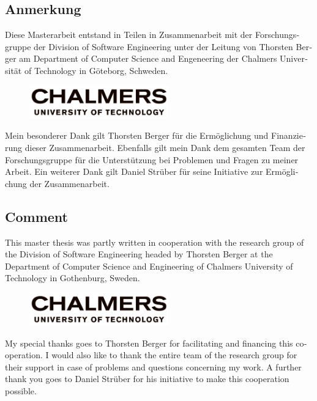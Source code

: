 
\begin{otherlanguage}{ngerman}
    \section*{Anmerkung}

Diese Masterarbeit entstand in Teilen in Zusammenarbeit mit der Forschungsgruppe der Division of Software Engineering unter der Leitung von Thorsten Berger am Department of Computer Science and Engeneering der Chalmers Universität of Technology in Göteborg, Schweden.

\begin{figure}[H]
    \centering
    \includegraphics[width=6cm]{logos/chalmers}
\end{figure}

Mein besonderer Dank gilt Thorsten Berger für die Ermöglichung und Finanzierung dieser Zusammenarbeit. Ebenfalls gilt mein Dank dem gesamten Team der Forschungsgruppe für die Unterstützung bei Problemen und Fragen zu meiner Arbeit. Ein weiterer Dank gilt Daniel Strüber für seine Initiative zur Ermöglichung der Zusammenarbeit.

\end{otherlanguage}

\begin{otherlanguage}{english}
    \section*{Comment}

This master thesis was partly written in cooperation with the research group of the Division of Software Engineering headed by Thorsten Berger at the Department of Computer Science and Engineering of Chalmers University of Technology in Gothenburg, Sweden.

\begin{figure}[H]
    \centering
    \includegraphics[width=6cm]{logos/chalmers}
\end{figure}

My special thanks goes to Thorsten Berger for facilitating and financing this cooperation. I would also like to thank the entire team of the research group for their support in case of problems and questions concerning my work. A further thank you goes to Daniel Strüber for his initiative to make this cooperation possible.

\end{otherlanguage}
\cleardoublepage